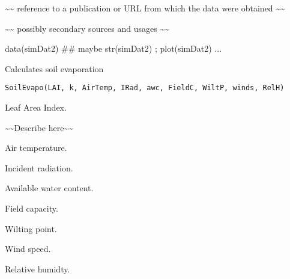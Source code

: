 \documentclass[letterpaper]{book}
\begin{document}
%
\begin{Source}\relax
\textasciitilde{}\textasciitilde{} reference to a publication or URL from which the data
were obtained \textasciitilde{}\textasciitilde{}
\end{Source}
%
\begin{References}\relax
\textasciitilde{}\textasciitilde{} possibly secondary sources and usages \textasciitilde{}\textasciitilde{}
\end{References}
%
\begin{Examples}
\begin{ExampleCode}
data(simDat2)
## maybe str(simDat2) ; plot(simDat2) ...
\end{ExampleCode}
\end{Examples}
%
\begin{Description}\relax
Calculates soil evaporation
\end{Description}
%
\begin{Usage}
\begin{verbatim}
SoilEvapo(LAI, k, AirTemp, IRad, awc, FieldC, WiltP, winds, RelH)
\end{verbatim}
\end{Usage}
%
\begin{Arguments}
\begin{ldescription}
\item[\code{LAI}] Leaf Area Index.

\item[\code{k}] \textasciitilde{}\textasciitilde{}Describe  here\textasciitilde{}\textasciitilde{}

\item[\code{AirTemp}] Air temperature.

\item[\code{IRad}] Incident radiation.

\item[\code{awc}] Available water content.

\item[\code{FieldC}] Field capacity.

\item[\code{WiltP}] Wilting point.

\item[\code{winds}] Wind speed.

\item[\code{RelH}] Relative humidty.
\end{ldescription}
\end{Arguments}
\end{document}
